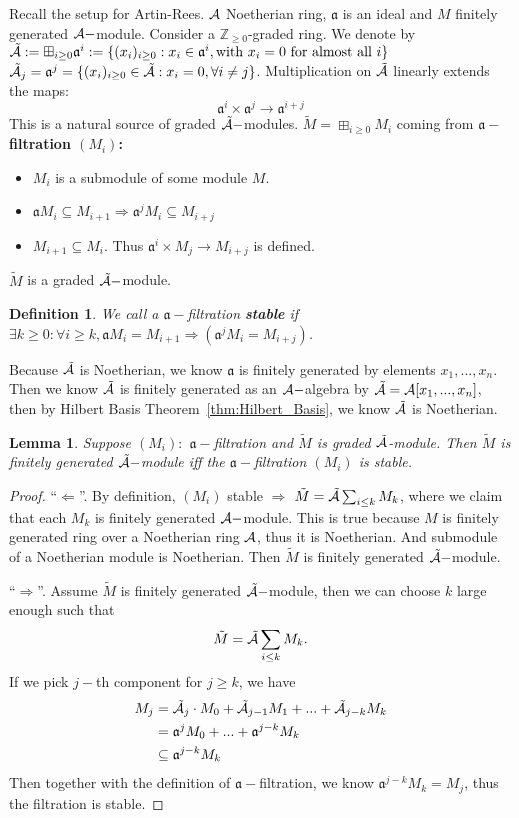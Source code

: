 \documentclass[11pt]{article}
\newtheorem{lemma}[thm]{Lemma}
\newtheorem{dfn}[thm]{Definition}
\newcommand{\intg}{\mathbb Z}
\newcommand{\sca}{{\mathfrak a}}
\newcommand{\cala}{{\cal A}}
\newcommand{\Lrta}{\Longrightarrow}
\newcommand{\lrta}{\longrightarrow}
\newcommand{\Llta}{\Longleftarrow}
\begin{document}
Recall the setup for Artin-Rees. $\cala$ Noetherian ring, $\sca$ is an ideal and $M$ finitely generated $\cala-$module. Consider a $\intg_{\geq 0}$-graded ring. We denote by $\tilde{\cala}:=\boxplus_{i\geq 0}\sca^i:=\{(x_i)_{i\geq 0}:x_i\in \sca^i, \text{with }x_i=0 \text{ for almost all }i\}$ 
$\tilde{\cala}_j=\sca^j=\{(x_i)_{i\geq 0}\in \tilde{\cala}: x_i=0, \forall i\neq j\}$. Multiplication on $\tilde{\cala}$ linearly extends the maps:
$$
\sca^i\times \sca^j\lrta \sca^{i+j}
$$
This is a natural source of graded $\tilde{\cala}-$modules. $\tilde{M}=\boxplus_{i\geq 0} M_i$ coming from  \textbf{$\sca-$filtration $(M_i)$:}
\begin{itemize}
\item $M_i$ is a submodule of some module $M$.
\item $\sca M_i\subseteq M_{i+1}\Lrta\sca^j M_i\subseteq M_{i+j}$
\item $M_{i+1}\subseteq M_i$. Thus $\sca^i\times M_j\lrta M_{i+j}$ is defined. 
\end{itemize}
$\tilde{M}$ is a graded $\tilde{\cala}-$module.
\begin{dfn}
We call a $\sca-$filtration \textbf{stable} if $\exists k\geq 0:\forall i\geq k,\sca M_i=M_{i+1}\Lrta(\sca^j M_i=M_{i+j})$.
\end{dfn}
Because $\tilde{\cala}$ is Noetherian, we know $\sca$ is finitely generated by elements $x_1,...,x_n$. Then we know $\tilde{\cala}$ is finitely generated as an $\cala-$algebra by $\tilde{\cala}=\cala[x_1,...,x_n]$, then by Hilbert Basis Theorem~\ref{thm:Hilbert_Basis}, we know $\tilde{\cala}$ is Noetherian.
\begin{lemma}
Suppose $(M_i):$ $\sca-$filtration and $\tilde{M}$ is graded $\tilde{\cala}$-module. Then $\tilde{M}$ is finitely generated $\tilde{\cala}-$module iff the $\sca-$filtration $(M_i)$ is stable.
\end{lemma}
\begin{proof}
``$\Llta$''. By definition, $(M_i)$ stable $\Lrta$ $\tilde{M}=\tilde{\cala}\sum_{i\leq k}M_k$, where we claim that each $M_k$ is finitely generated $\cala-$module. This is true because $M$ is finitely generated ring over a Noetherian ring $\cala$, thus it is Noetherian. And submodule of a Noetherian module is Noetherian. Then $\tilde{M}$ is finitely generated $\tilde{\cala}-$module.

``$\Lrta$''. Assume $\tilde{M}$ is finitely generated $\tilde{\cala}-$module, then we can choose $k$ large enough such that 
$$
\tilde{M}=\tilde{\cala}\sum_{i\leq k} M_k.
$$
If we pick $j-$th component for $j\geq k$, we have 
$$
\begin{aligned}
M_j&=\tilde{\cala}_j\cdot M_0+\tilde{\cala}_{j-1}M_1+...+\tilde{\cala}_{j-k}M_k\\
& = \sca^j M_0+...+\sca^{j-k}M_k\\
&\subseteq \sca^{j-k}M_k
\end{aligned}
$$
Then together with the definition of $\sca-$filtration, we know $\sca^{j-k}M_k=M_j$, thus the filtration is stable.
\end{proof}
\end{document}
